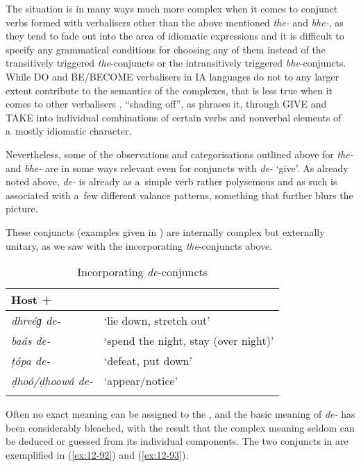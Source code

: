 \begin{exe}
The situation is in many ways much more complex when it comes to conjunct verbs formed with
verbalisers other than the above mentioned \textit{the-} and \textit{bhe-}, as they tend to fade out
into the area of idiomatic expressions and it is difficult to specify any grammatical conditions for
choosing any of them instead of the transitively triggered \textit{the}-conjuncts or the
intransitively triggered \textit{bhe}-conjuncts. While DO and BE/BECOME verbalisers in IA
languages do not to any larger extent contribute to the semantics of the complexes, that is less
true when it comes to other verbalisers \citep[78--79]{gambhir1993}, ``shading off'', as
\citet[157]{masica1993} phrases it, through GIVE and TAKE into individual combinations of certain
verbs and nonverbal elements of a~mostly idiomatic character.



Nevertheless, some of the observations and categorisations outlined above for \textit{the-} and \textit{bhe-} are in some ways relevant even for conjuncts with \textit{de-} `give'. As already noted above, \textit{de-} is already as a~simple verb rather polysemous and as such is associated with a~few different valance patterns, something that further blurs the picture.

\largerpage
{} These conjuncts (examples given in ) are internally complex but externally unitary, as we saw with the incorporating \textit{the}-conjuncts above. 


\begin{table}[ht]
\caption{Incorporating \textit{de}-conjuncts}
\begin{tabularx}{.75\textwidth}{ l@{\hspace{45pt}} Q }
\lsptoprule
Host +  &
\\\midrule
\textit{dhreéɡ de-} &
`lie down, stretch out'\\
\textit{baás de-} &
`spend the night, stay (over night)'\\
\textit{ṭópa de-} &
`defeat, put down'\\
\textit{ḍhoó/ḍhoowá de-} &
`appear/notice'\\\lspbottomrule
\end{tabularx}
\label{tab:12-7}
\end{table}


Often no exact meaning can be assigned to the , and the basic meaning of \textit{de-} has been considerably bleached, with the result that the complex meaning seldom can be deduced or guessed from its individual components. The two conjuncts in  are exemplified in (\ref{ex:12-92}) and (\ref{ex:12-93}).


\end{exe}
